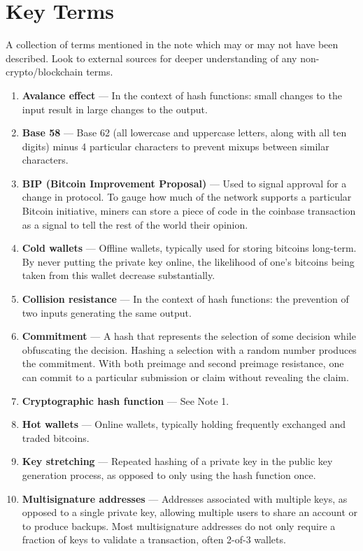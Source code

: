 \documentclass[full.tex]{subfiles}
\begin{document}
    \section*{Key Terms}
    \noindent A collection of terms mentioned in the note which may or may not have been described. Look to external sources for deeper understanding of any non-crypto/blockchain terms.
    \begin{enumerate}
        \item \textbf{Avalance effect} --- In the context of hash functions: small changes to the input result in large changes to the output.
        \item \textbf{Base 58} --- Base 62 (all lowercase and uppercase letters, along with all ten digits) minus 4 particular characters to prevent mixups between similar characters.
        \item \textbf{BIP (Bitcoin Improvement Proposal)} --- Used to signal approval for a change in protocol. To gauge how much of the network supports a particular Bitcoin initiative, miners can store a piece of code in the coinbase transaction as a signal to tell the rest of the world their opinion. 
        \item \textbf{Cold wallets} --- Offline wallets, typically used for storing bitcoins long-term. By never putting the private key online, the likelihood of one's bitcoins being taken from this wallet decrease substantially.
        \item \textbf{Collision resistance} --- In the context of hash functions: the prevention of two inputs generating the same output.
        \item \textbf{Commitment} --- A hash that represents the selection of some decision while obfuscating the decision. Hashing a selection with a random number produces the commitment. With both preimage and second preimage resistance, one can commit to a particular submission or claim without revealing the claim.
        \item \textbf{Cryptographic hash function} --- See Note 1.
        \item \textbf{Hot wallets} --- Online wallets, typically holding frequently exchanged and traded bitcoins. 
        \item \textbf{Key stretching} --- Repeated hashing of a private key in the public key generation process, as opposed to only using the hash function once.
        \item \textbf{Multisignature addresses} --- Addresses associated with multiple keys, as opposed to a single private key, allowing multiple users to share an account or to produce backups. Most multisignature addresses do not only require a fraction of keys to validate a transaction, often 2-of-3 wallets.

\end{enumerate}
\end{document}

